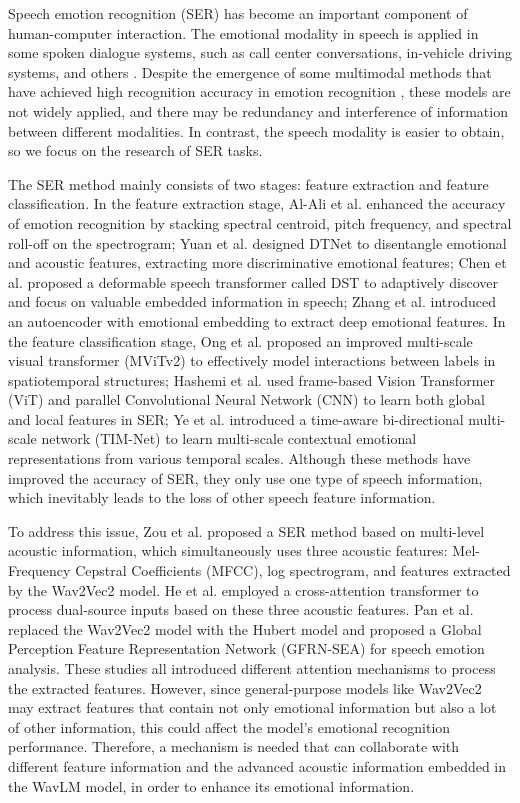\documentclass[runningheads]{llncs}
\begin{document}
Speech emotion recognition (SER) has become an important component of human-computer interaction. The emotional modality in speech is applied in some spoken dialogue systems, such as call center conversations, in-vehicle driving systems, and others \cite{b1}. Despite the emergence of some multimodal methods that have achieved high recognition accuracy in emotion recognition \cite{b10,b11,b12}, these models are not widely applied, and there may be redundancy and interference of information between different modalities. In contrast, the speech modality is easier to obtain, so we focus on the research of SER tasks.

The SER method mainly consists of two stages: feature extraction and feature classification. In the feature extraction stage, Al-Ali et al.\cite{b2} enhanced the accuracy of emotion recognition by stacking spectral centroid, pitch frequency, and spectral roll-off on the spectrogram; Yuan et al.\cite{b3} designed DTNet to disentangle emotional and acoustic features, extracting more discriminative emotional features; Chen et al.\cite{b4} proposed a deformable speech transformer called DST to adaptively discover and focus on valuable embedded information in speech; Zhang et al.\cite{b6} introduced an autoencoder with emotional embedding to extract deep emotional features. In the feature classification stage, Ong et al.\cite{b5} proposed an improved multi-scale visual transformer (MViTv2) to effectively model interactions between labels in spatiotemporal structures; Hashemi et al.\cite{b7} used frame-based Vision Transformer (ViT) and parallel Convolutional Neural Network (CNN) to learn both global and local features in SER; Ye et al.\cite{b8} introduced a time-aware bi-directional multi-scale network (TIM-Net) to learn multi-scale contextual emotional representations from various temporal scales. Although these methods have improved the accuracy of SER, they only use one type of speech information, which inevitably leads to the loss of other speech feature information.

To address this issue, Zou et al.\cite{b19} proposed a SER method based on multi-level acoustic information, which simultaneously uses three acoustic features: Mel-Frequency Cepstral Coefficients (MFCC), log spectrogram, and features extracted by the Wav2Vec2 model. He et al.\cite{b14} employed a cross-attention transformer to process dual-source inputs based on these three acoustic features. Pan et al.\cite{b9} replaced the Wav2Vec2 model with the Hubert model and proposed a Global Perception Feature Representation Network (GFRN-SEA) for speech emotion analysis. These studies all introduced different attention mechanisms to process the extracted features. However, since general-purpose models like Wav2Vec2 may extract features that contain not only emotional information but also a lot of other information, this could affect the model's emotional recognition performance. Therefore, a mechanism is needed that can collaborate with different feature information and the advanced acoustic information embedded in the WavLM model, in order to enhance its emotional information.
\end{document}
